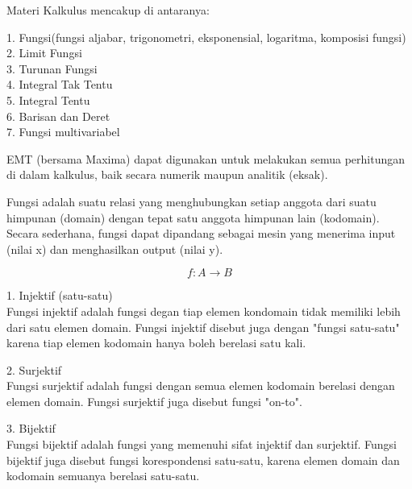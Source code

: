 \documentclass[a4paper,10pt]{article}
\begin{document}
\begin{eulernotebook}
\begin{eulercomment}
Materi Kalkulus mencakup di antaranya:

1. Fungsi(fungsi aljabar, trigonometri, eksponensial, logaritma,
komposisi fungsi)\\
2. Limit Fungsi\\
3. Turunan Fungsi\\
4. Integral Tak Tentu\\
5. Integral Tentu\\
6. Barisan dan Deret\\
7. Fungsi multivariabel

EMT (bersama Maxima) dapat digunakan untuk melakukan semua perhitungan
di dalam kalkulus, baik secara numerik maupun analitik (eksak).

\begin{eulercomment}
\begin{eulercomment}
Fungsi adalah suatu relasi yang menghubungkan setiap anggota dari
suatu himpunan (domain) dengan tepat satu anggota himpunan lain
(kodomain). Secara sederhana, fungsi dapat dipandang sebagai mesin
yang menerima input (nilai x) dan menghasilkan output (nilai y).

\end{eulercomment}
\begin{eulerformula}
\[
f: A \to B
\]
\end{eulerformula}
\begin{eulercomment}
\end{eulercomment}
\begin{eulercomment}
1. Injektif (satu-satu)\\
Fungsi injektif adalah fungsi degan tiap elemen kondomain tidak
memiliki lebih dari satu elemen domain. Fungsi injektif disebut juga
dengan "fungsi satu-satu" karena tiap elemen kodomain hanya boleh
berelasi satu kali.

2. Surjektif\\
Fungsi surjektif adalah fungsi dengan semua elemen kodomain berelasi
dengan elemen domain. Fungsi surjektif juga disebut fungsi "on-to".

3. Bijektif\\
Fungsi bijektif adalah fungsi yang memenuhi sifat injektif dan
surjektif. Fungsi bijektif juga disebut fungsi korespondensi
satu-satu, karena elemen domain dan kodomain semuanya berelasi
satu-satu.


\end{eulercomment}
\end{eulercomment}
\end{eulercomment}
\end{eulernotebook}
\end{document}
